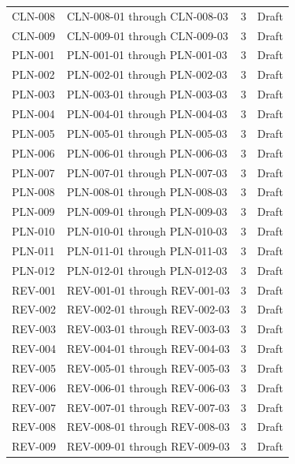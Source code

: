 \documentclass[11pt,letterpaper]{article}
\begin{document}
\begin{small}
\begin{longtable}{@{}L{0.14\textwidth}L{0.56\textwidth}L{0.12\textwidth}L{0.10\textwidth}@{}}
\addlinespace[2pt]
CLN-008 & CLN-008-01 through CLN-008-03 & 3 & Draft \\
\addlinespace[2pt]
CLN-009 & CLN-009-01 through CLN-009-03 & 3 & Draft \\
\addlinespace[2pt]
PLN-001 & PLN-001-01 through PLN-001-03 & 3 & Draft \\
\addlinespace[2pt]
PLN-002 & PLN-002-01 through PLN-002-03 & 3 & Draft \\
\addlinespace[2pt]
PLN-003 & PLN-003-01 through PLN-003-03 & 3 & Draft \\
\addlinespace[2pt]
PLN-004 & PLN-004-01 through PLN-004-03 & 3 & Draft \\
\addlinespace[2pt]
PLN-005 & PLN-005-01 through PLN-005-03 & 3 & Draft \\
\addlinespace[2pt]
PLN-006 & PLN-006-01 through PLN-006-03 & 3 & Draft \\
\addlinespace[2pt]
PLN-007 & PLN-007-01 through PLN-007-03 & 3 & Draft \\
\addlinespace[2pt]
PLN-008 & PLN-008-01 through PLN-008-03 & 3 & Draft \\
\addlinespace[2pt]
PLN-009 & PLN-009-01 through PLN-009-03 & 3 & Draft \\
\addlinespace[2pt]
PLN-010 & PLN-010-01 through PLN-010-03 & 3 & Draft \\
\addlinespace[2pt]
PLN-011 & PLN-011-01 through PLN-011-03 & 3 & Draft \\
\addlinespace[2pt]
PLN-012 & PLN-012-01 through PLN-012-03 & 3 & Draft \\
\addlinespace[2pt]
REV-001 & REV-001-01 through REV-001-03 & 3 & Draft \\
\addlinespace[2pt]
REV-002 & REV-002-01 through REV-002-03 & 3 & Draft \\
\addlinespace[2pt]
REV-003 & REV-003-01 through REV-003-03 & 3 & Draft \\
\addlinespace[2pt]
REV-004 & REV-004-01 through REV-004-03 & 3 & Draft \\
\addlinespace[2pt]
REV-005 & REV-005-01 through REV-005-03 & 3 & Draft \\
\addlinespace[2pt]
REV-006 & REV-006-01 through REV-006-03 & 3 & Draft \\
\addlinespace[2pt]
REV-007 & REV-007-01 through REV-007-03 & 3 & Draft \\
\addlinespace[2pt]
REV-008 & REV-008-01 through REV-008-03 & 3 & Draft \\
\addlinespace[2pt]
REV-009 & REV-009-01 through REV-009-03 & 3 & Draft \\

\end{longtable}
\end{small}
\end{document}
